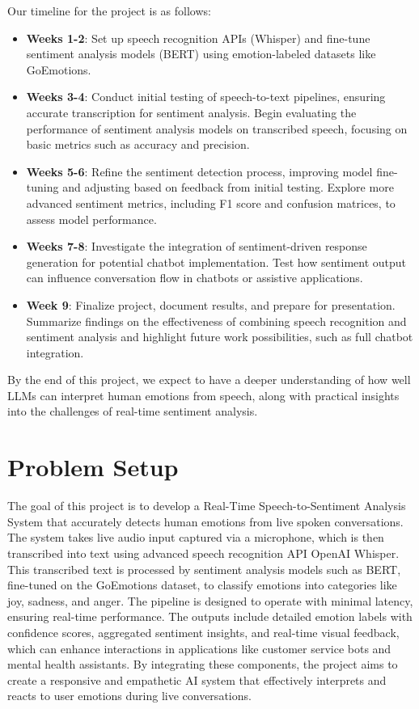 \documentclass{article} %
\begin{document}
Our timeline for the project is as follows:

\begin{itemize}
    \item \textbf{Weeks 1-2}: Set up speech recognition APIs (Whisper) and fine-tune sentiment analysis models (BERT) using emotion-labeled datasets like GoEmotions.
    \item \textbf{Weeks 3-4}: Conduct initial testing of speech-to-text pipelines, ensuring accurate transcription for sentiment analysis. Begin evaluating the performance of sentiment analysis models on transcribed speech, focusing on basic metrics such as accuracy and precision.
    \item \textbf{Weeks 5-6}: Refine the sentiment detection process, improving model fine-tuning and adjusting based on feedback from initial testing. Explore more advanced sentiment metrics, including F1 score and confusion matrices, to assess model performance.
    \item \textbf{Weeks 7-8}: Investigate the integration of sentiment-driven response generation for potential chatbot implementation. Test how sentiment output can influence conversation flow in chatbots or assistive applications.
    \item \textbf{Week 9}: Finalize project, document results, and prepare for presentation. Summarize findings on the effectiveness of combining speech recognition and sentiment analysis and highlight future work possibilities, such as full chatbot integration.
\end{itemize}

By the end of this project, we expect to have a deeper understanding of how well LLMs can interpret human emotions from speech, along with practical insights into the challenges of real-time sentiment analysis.

\section{Problem Setup}

The goal of this project is to develop a Real-Time Speech-to-Sentiment Analysis System that accurately detects human emotions from live spoken conversations. The system takes live audio input captured via a microphone, which is then transcribed into text using advanced speech recognition API OpenAI Whisper. This transcribed text is processed by sentiment analysis models such as BERT, fine-tuned on the GoEmotions dataset, to classify emotions into categories like joy, sadness, and anger. The pipeline is designed to operate with minimal latency, ensuring real-time performance. The outputs include detailed emotion labels with confidence scores, aggregated sentiment insights, and real-time visual feedback, which can enhance interactions in applications like customer service bots and mental health assistants. By integrating these components, the project aims to create a responsive and empathetic AI system that effectively interprets and reacts to user emotions during live conversations.
\end{document}
